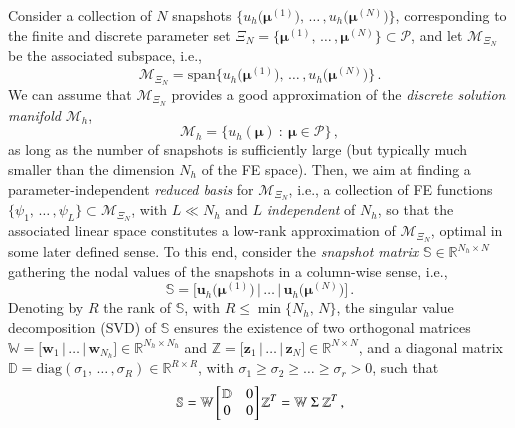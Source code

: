 \documentclass{elsarticle}
\numberwithin{equation}{section}
\theoremstyle{theorem}
\theoremstyle{definition}
\theoremstyle{remark}
\theoremstyle{proposition}
\numberwithin{figure}{section}
\newcommand{\bg}[1]{\boldsymbol{#1}}
\begin{document}
		Consider a collection of $N$ snapshots $\big\lbrace u_h \big( \bg{\mu}^{(1)} \big), \, \ldots \, , u_h \big( \bg{\mu}^{(N)} \big) \big\rbrace$, corresponding to the finite and discrete parameter set $\Xi_N = \big\lbrace \bg{\mu}^{(1)}, \, \ldots \, , \bg{\mu}^{(N)} \big\rbrace \subset \mathcal{P}$, and let $\mathcal{M}_{\Xi_N}$ be the associated subspace, i.e., \[ \mathcal{M}_{\Xi_N} = \text{span} \big\lbrace u_h \big( \bg{\mu}^{(1)} \big), \, \ldots \, , u_h \big( \bg{\mu}^{(N)} \big) \big\rbrace \, . \] We can assume that $\mathcal{M}_{\Xi_N}$ provides a good approximation of the \emph{discrete solution manifold} $\mathcal{M}_h$, \[ \mathcal{M}_h = \big\lbrace u_h(\bg{\mu}) ~ : ~ \bg{\mu} \in \mathcal{P} \big\rbrace \, , \] as long as the number of snapshots is sufficiently large (but typically much smaller than the dimension ${N_h}$ of the FE space). Then, we aim at finding a parameter-independent \emph{reduced basis} for $\mathcal{M}_{\Xi_N}$, i.e., a collection of FE functions $\big\lbrace \psi_1, \, \ldots \, , \psi_L \big\rbrace \subset \mathcal{M}_{\Xi_N}$, with $L \ll {N_h}$ and $L$ \emph{independent} of $N_h$, so that the associated linear space 
		constitutes a low-rank approximation of $\mathcal{M}_{\Xi_N}$, optimal in some later defined sense. To this end, consider the \emph{snapshot matrix} $\mathbb{S} \in \mathbb{R}^{{N_h} \times N}$ gathering the nodal values of the snapshots in a column-wise sense, i.e.,
		\begin{equation*}
			\mathbb{S} = \big[ \mathbf{u}_h \big( \bg{\mu}^{(1)} \big) \, \big| \, \ldots \, \big| \, \mathbf{u}_h \big( \bg{\mu}^{(N)} \big) \big] \, .
		\end{equation*}
		Denoting by $R$ the rank of $\mathbb{S}$, with $R \leq \min \big\lbrace{ {N_h}, \, N \big\rbrace}$, the singular value decomposition (SVD) of $\mathbb{S}$ ensures the existence of two orthogonal matrices $\mathbb{W} = \big[ \mathbf{w}_1 \, \big| \, \ldots \, \big| \, \mathbf{w}_{N_h} \big] \in \mathbb{R}^{{N_h} \times {N_h}}$ and $\mathbb{Z} = \big[ \mathbf{z}_1 \, \big| \, \ldots \, \big| \, \mathbf{z}_N \big] \in \mathbb{R}^{N \times N}$, and a diagonal matrix $\mathbb{D} = \text{diag}(\sigma_1, \, \ldots \, , \sigma_R) \in \mathbb{R}^{R \times R}$, with $\sigma_1 \geq \sigma_2 \geq \ldots \geq \sigma_r > 0$, such that
		\begin{equation}
			\label{eq:svd}
			\mathbb{S} = \mathbb{W} 
			\begin{bmatrix}
			\hspace*{-0.15cm}
			\begin{array}{cc}
				\mathbb{D} & 0 \\
				0 & 0
			\end{array} 
			\hspace*{-0.15cm}
			\end{bmatrix}
			\mathbb{Z}^T = \mathbb{W} ~ \Sigma ~ \mathbb{Z}^T \, ,
		\end{equation}
\end{document}

